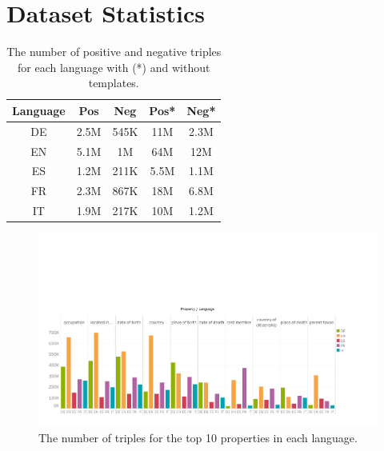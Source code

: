 \section{Dataset Statistics}

\begin{table}[t!]
\fontsize{10}{10}\selectfont
\label{table:datasetstats}
\centering
\begin{tabular}{c | c c c c}
\toprule
Language & Pos  & Neg  & Pos*  & Neg* \\ \midrule
DE       & 2.5M & 545K & 11M  & 2.3M \\ %
EN       & 5.1M & 1M   & 64M  & 12M  \\ %
ES       & 1.2M & 211K & 5.5M & 1.1M \\ %
FR       & 2.3M & 867K & 18M  & 6.8M \\ %
IT       & 1.9M & 217K & 10M  & 1.2M \\ %
\bottomrule

\end{tabular}
\caption{The number of positive and negative triples for each language with (*) and without templates.}
\label{data:stats}
\end{table}


\begin{figure}%
\centering
\includegraphics[width=\textwidth]{images/count_examples-property_per_language_wide.pdf}
\caption{The number of triples for the top 10 properties in each language.}
\label{fig:top_10}
\end{figure}